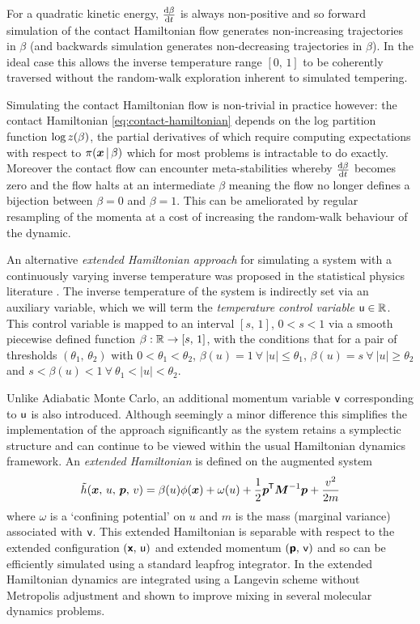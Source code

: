 For a quadratic kinetic energy, $\frac{\mathrm{d} \beta}{\mathrm{d} t}$ is always non-positive and so forward simulation of the contact Hamiltonian flow generates non-increa\-sing trajectories in $\beta$ (and backwards simulation generates non-decreas\-ing trajectories in $\beta$). In the ideal case this allows the inverse temperature range $[0,\,1]$ to be coherently traversed without the random-walk exploration inherent to simulated tempering.

Simulating the contact Hamiltonian flow is non-trivial in practice however: the contact Hamiltonian \eqref{eq:contact-hamiltonian} depends on the log partition function $\log z(\beta)$, the partial derivatives of which require computing expectations with respect to $\pi(\boldsymbol{x}\operatorname{|}\beta)$ which for most problems is intractable to do exactly. Moreover the contact flow can encounter meta-stabilities whereby $\frac{\mathrm{d} \beta}{\mathrm{d} t}$ becomes zero and the flow halts at an intermediate $\beta$ meaning the flow no longer defines a bijection between $\beta=0$ and $\beta=1$. This can be ameliorated by regular resampling of the momenta at a cost of increasing the random-walk behaviour of the dynamic.

An alternative \emph{extended Hamiltonian approach} for simulating a system with a continuously varying inverse temperature was proposed in the statistical physics literature \citep{gobbo2015extended}. The inverse temperature of the system is indirectly set via an auxiliary variable, which we will term the \emph{temperature control variable} $\mathsf{u} \in \mathbb{R}$. This control variable is mapped to an interval $[s,\,1]$, $0 < s < 1$ via a smooth piecewise defined function $\beta : \mathbb{R} \to [s,\,1]$, with the conditions that for a pair of thresholds $(\theta_1,\,\theta_2)$ with $0 < \theta_1 < \theta_2$, $\beta(u) = 1 ~\forall~ |u| \leq \theta_1$, $\beta(u) = s ~\forall~ |u| \geq \theta_2$ and $s < \beta(u) < 1 ~\forall~ \theta_1 < |u| < \theta_2$.

Unlike Adiabatic Monte Carlo, an additional momentum variable $\mathsf{v}$ corresponding to $\mathsf{u}$ is also introduced. Although seemingly a minor difference this simplifies the implementation of the approach significantly as the system retains a symplectic structure and can continue to be viewed within the usual Hamiltonian dynamics framework. An \emph{extended Hamiltonian} is defined on the augmented system
\begin{equation}\label{eq:extended-hamiltonian-gobbo-leimkuhler}
  \extended{\hamiltonian}(\vct{x},\,u,\,\vct{p},\,v) = 
  \beta(u) \phi(\vct{x}) + \omega(u) + \frac{1}{2} \vct{p}\tr\mtx{M}^{-1}\vct{p} + \frac{v^2}{2m}
\end{equation}
where $\omega$ is a `confining potential' on $u$ and $m$ is the mass (marginal variance) associated with $\mathsf{v}$. This extended Hamiltonian is separable with respect to the extended configuration $(\boldsymbol{\mathsf{x}},\,\mathsf{u})$ and extended momentum $(\boldsymbol{\mathsf{p}},\,\mathsf{v})$ and so can be efficiently simulated using a standard leapfrog integrator. In \cite{gobbo2015extended} the extended Hamiltonian dynamics are integrated using a Langevin scheme without Metropolis adjustment and shown to improve mixing in several molecular dynamics problems. 

